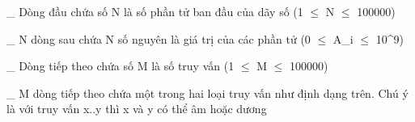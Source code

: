 \_ Dòng đầu chứa số N là số phần tử ban đầu của dãy số (1 $\le$ N $\le$ 100000)   


   \_ N dòng sau chứa N số nguyên là giá trị của các phần tử (0 $\le$ A\_i $\le$ 10^9)   


   \_ Dòng tiếp theo chứa số M là số truy vấn (1 $\le$ M $\le$ 100000)   


   \_ M dòng tiếp theo chứa một trong hai loại truy vấn như định dạng trên. Chú ý là với truy vấn x..y thì x và y có thể âm hoặc dương